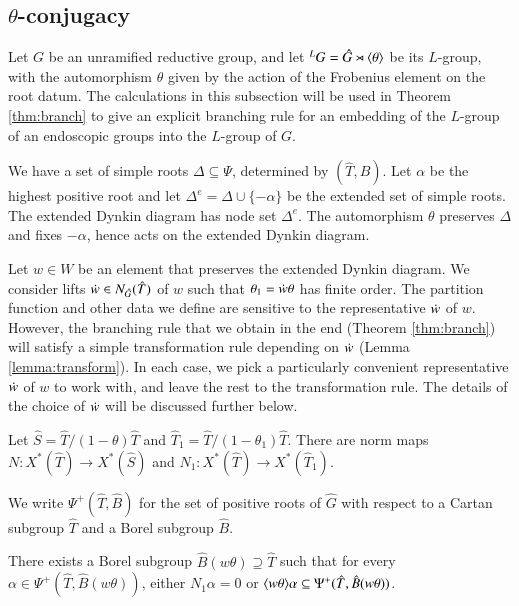 \subsection{$\theta$-conjugacy}\label{sec:theta-conj}

Let $G$ be an unramified reductive group, and let ${}^LG = \hat G
\rtimes \langle{\theta}\rangle$ be its $L$-group, with the automorphism $\theta$
given by the action of the Frobenius element on the root datum.  
The calculations in this subsection will be used in Theorem
\ref{thm:branch} to give an explicit branching rule for an embedding of
the $L$-group of an endoscopic groups into the $L$-group of $G$.

We have a set of simple roots $\Delta\subseteq \Psi$, determined by
$(\hat T,\hat B)$.  Let $\alpha$ be the highest positive root and let
$\Delta^e = \Delta \cup \{-\alpha\}$ be the extended set of simple
roots.  The extended Dynkin diagram has node set $\Delta^e$.  The
automorphism $\theta$ preserves $\Delta$ and fixes $-\alpha$, hence
acts on the extended Dynkin diagram.

Let $w\in W$ be an element that preserves the extended Dynkin diagram.
We consider lifts $\dot w\in N_{\hat G}(\hat T)$ of $w$ such that
$\theta_1 = \dot w \theta$ has finite order.  The partition function
and other data we define are sensitive to the
representative $\dot w$ of $w$.  However, the branching rule that we
obtain in the end (Theorem \ref{thm:branch}) will satisfy a simple
transformation rule depending on $\dot w$ (Lemma
\ref{lemma:transform}).  In each case, we pick a particularly
convenient representative $\dot w$ of $w$ to work with, and leave the
rest to the transformation rule.  The details of the choice of $\dot w$
will be discussed further below.

Let $\hat S = \hat T/(1-\theta)\hat T$ and $\hat T_1 = \hat
T/(1-\theta_1)\hat T$.  There are norm maps $N:X^*(\hat T)\to X^*(\hat
S)$ and $N_1:X^*(\hat T)\to X^*(\hat T_1)$.  

We write $\Psi^+(\hat T,\hat B)$ for the set of positive roots of
$\hat G$ with respect to a Cartan subgroup $\hat T$ and a Borel subgroup
$\hat B$.

\begin{lemma}\label{lemma:adapted}
  There exists a Borel subgroup $\hat
  B(w\theta)\supseteq \hat T$ such that for every
  $\alpha\in\Psi^+(\hat T,\hat B(w\theta))$, either $N_1\alpha = 0$
  or $\langle{w\theta}\rangle\alpha\subseteq \Psi^+(\hat T,\hat B(w\theta))$.
\end{lemma}

